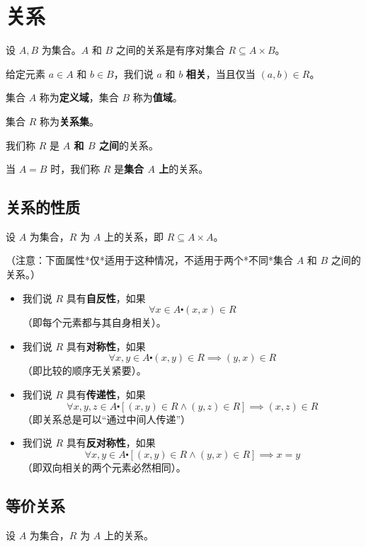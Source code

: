 \section{关系}

设 $A,B$ 为集合。$A$ 和 $B$ 之间的关系是有序对集合 $R \subseteq A \times B$。

给定元素 $a \in A$ 和 $b \in B$，我们说 $a$ 和 $b$ \textbf{相关}，当且仅当 $ (a, b) \in R$。

集合 $A$ 称为\textbf{定义域}，集合 $B$ 称为\textbf{值域}。

集合 $R$ 称为\textbf{关系集}。

我们称 $R$ 是 \textbf{$A$ 和 $B$ 之间}的关系。

当 $A = B$ 时，我们称 $R$ 是\textbf{集合 $A$ 上}的关系。

\subsection{关系的性质}

设 $A$ 为集合，$R$ 为 $A$ 上的关系，即 $R \subseteq A \times A$。

（注意：下面属性*仅*适用于这种情况，不适用于两个*不同*集合 $A$ 和 $B$ 之间的关系。）

\begin{itemize}
    \item 我们说 $R$ 具有\textbf{自反性}，如果
          \[\forall x \in A \centerdot (x, x) \in R\]
          （即每个元素都与其自身相关）。
    \item 我们说 $R$ 具有\textbf{对称性}，如果
          \[\forall x, y \in A \centerdot (x, y) \in R \implies (y, x) \in R\]
          （即比较的顺序无关紧要）。
    \item 我们说 $R$ 具有\textbf{传递性}，如果
          \[\forall x, y, z \in A \centerdot [(x, y) \in R \land (y, z) \in R] \implies (x, z) \in R\]
          （即关系总是可以``通过中间人传递''）
    \item 我们说 $R$ 具有\textbf{反对称性}，如果
          \[\forall x, y \in A \centerdot [(x, y) \in R \land (y, x) \in R] \implies x = y\]
          （即双向相关的两个元素必然相同）。
\end{itemize}

\subsection{等价关系}

设 $A$ 为集合，$R$ 为 $A$ 上的关系。

